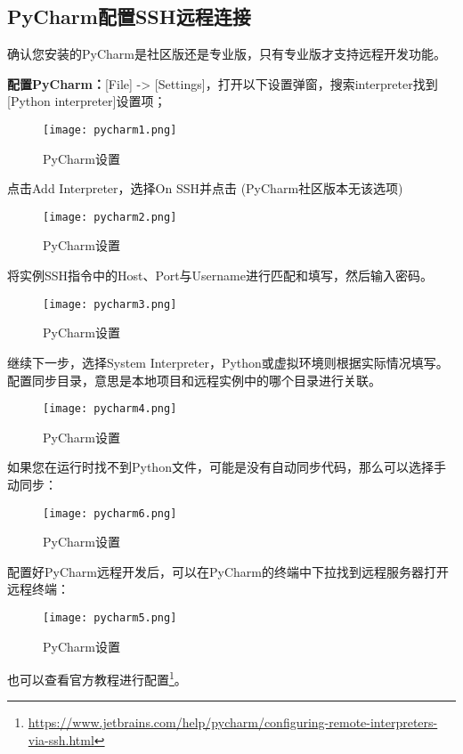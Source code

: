 \documentclass[lang=cn,a4paper,newtx]{elegantpaper}
\begin{document}
\newpage
\subsection{PyCharm配置SSH远程连接}
确认您安装的PyCharm是社区版还是专业版，只有专业版才支持远程开发功能。

\textbf{配置PyCharm：}[File] -> [Settings]，打开以下设置弹窗，搜索interpreter找到[Python interpreter]设置项；
\begin{figure}[hbpt]
  \centering
  \texttt{[image: pycharm1.png]}
  \caption{PyCharm设置}
  \label{fig:pycharm1}
\end{figure}

点击Add Interpreter，选择On SSH并点击 (PyCharm社区版本无该选项)
\begin{figure}[hbpt]
  \centering
  \texttt{[image: pycharm2.png]}
  \caption{PyCharm设置}
  \label{fig:pycharm2}
\end{figure}

将实例SSH指令中的Host、Port与Username进行匹配和填写，然后输入密码。
\begin{figure}[hbpt]
  \centering
  \texttt{[image: pycharm3.png]}
  \caption{PyCharm设置}
  \label{fig:pycharm3}
\end{figure}

\newpage
继续下一步，选择System Interpreter，Python或虚拟环境则根据实际情况填写。
配置同步目录，意思是本地项目和远程实例中的哪个目录进行关联。
\begin{figure}[hbpt]
  \centering
  \texttt{[image: pycharm4.png]}
  \caption{PyCharm设置}
  \label{fig:pycharm4}
\end{figure}

如果您在运行时找不到Python文件，可能是没有自动同步代码，那么可以选择手动同步：
\begin{figure}[hbpt]
  \centering
  \texttt{[image: pycharm6.png]}
  \caption{PyCharm设置}
  \label{fig:pycharm6}
\end{figure}

\newpage
配置好PyCharm远程开发后，可以在PyCharm的终端中下拉找到远程服务器打开远程终端：
\begin{figure}[hbpt]
  \centering
  \texttt{[image: pycharm5.png]}
  \caption{PyCharm设置}
  \label{fig:pycharm5}
\end{figure}

也可以查看官方教程进行配置\footnote{\url{https://www.jetbrains.com/help/pycharm/configuring-remote-interpreters-via-ssh.html}}。
\end{document}
